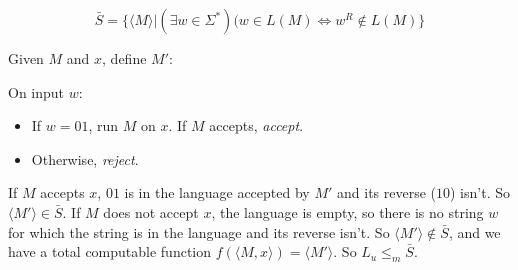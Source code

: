 \documentclass{article}
\begin{document}
%
%
%
%
%


$$\bar{S} = \{\langle M \rangle | (\exists w \in \Sigma^*) (w \in L(M) \iff w^R \notin L(M)\}$$

Given $M$ and $x$, define $M'$:

On input $w$:
\begin{itemize}
	\item If $w = 01$, run $M$ on $x$. If $M$ accepts, \textit{accept}.
	\item Otherwise, \textit{reject}.
\end{itemize}

If $M$ accepts $x$, $01$ is in the language accepted by $M'$ and its reverse
($10$) isn't. So $\langle M' \rangle \in \bar{S}$. If $M$ does not accept $x$,
the language is empty, so there is no string $w$ for which the string is in the
language and its reverse isn't. So $\langle M' \rangle \notin \bar{S}$, and we
have a total computable function $f(\langle M, x \rangle) = \langle M' \rangle$.
So $L_u \leq_m \bar{S}$.


%
%
%
\end{document}
